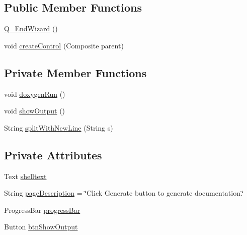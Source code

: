 \subsection*{Public Member Functions}
\begin{DoxyCompactItemize}
\item 
\hyperlink{classit_1_1isislab_1_1masonhelperdocumentation_1_1mason_1_1wizards_1_1_q___end_wizard_af9884b961a03b01b6309f83fdf8489c6}{Q\-\_\-\-End\-Wizard} ()
\item 
void \hyperlink{classit_1_1isislab_1_1masonhelperdocumentation_1_1mason_1_1wizards_1_1_q___end_wizard_a5370c5c6b82b0ae5dc3fede5a15bb871}{create\-Control} (Composite parent)
\end{DoxyCompactItemize}
\subsection*{Private Member Functions}
\begin{DoxyCompactItemize}
\item 
void \hyperlink{classit_1_1isislab_1_1masonhelperdocumentation_1_1mason_1_1wizards_1_1_q___end_wizard_a5711bf4858bd7e5787743ec96669a19d}{doxygen\-Run} ()
\item 
void \hyperlink{classit_1_1isislab_1_1masonhelperdocumentation_1_1mason_1_1wizards_1_1_q___end_wizard_a944a5732f2c5ba72de80c4bd014c3afb}{show\-Output} ()
\item 
String \hyperlink{classit_1_1isislab_1_1masonhelperdocumentation_1_1mason_1_1wizards_1_1_q___end_wizard_a1cdec1efdad895973386d4679b790a1c}{split\-With\-New\-Line} (String s)
\end{DoxyCompactItemize}
\subsection*{Private Attributes}
\begin{DoxyCompactItemize}
\item 
Text \hyperlink{classit_1_1isislab_1_1masonhelperdocumentation_1_1mason_1_1wizards_1_1_q___end_wizard_ab4650e9141ffb45563506bcf2b5daa4e}{shelltext}
\item 
String \hyperlink{classit_1_1isislab_1_1masonhelperdocumentation_1_1mason_1_1wizards_1_1_q___end_wizard_ad26a3bb26c50c2d98f9e6931ac3d9e93}{page\-Description} = \char`\"{}Click Generate button to generate documentation.\char`\"{}
\item 
Progress\-Bar \hyperlink{classit_1_1isislab_1_1masonhelperdocumentation_1_1mason_1_1wizards_1_1_q___end_wizard_a43d65086e656c40478f720a0a9cac522}{progress\-Bar}
\item 
Button \hyperlink{classit_1_1isislab_1_1masonhelperdocumentation_1_1mason_1_1wizards_1_1_q___end_wizard_adabc78dc53c9ffd3c77d6e453db02cb6}{btn\-Show\-Output}
\end{DoxyCompactItemize}
